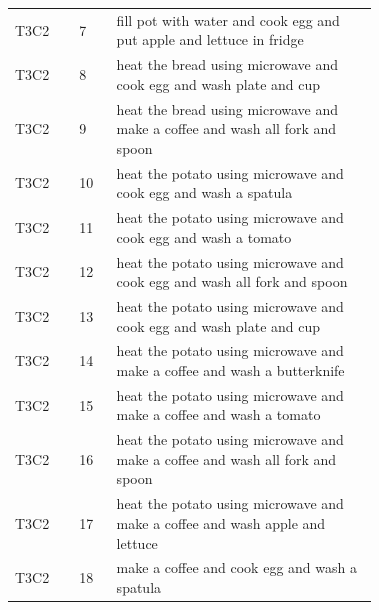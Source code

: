 \documentclass[letterpaper,10pt,onecolumn]{IEEEtran}
\begin{document}
{\begin{longtable}{@{}llp{0.72\linewidth}@{}}
T3C2 & 7 & fill pot with water and cook egg and put apple and lettuce in fridge \\
T3C2 & 8 & heat the bread using microwave and cook egg and wash plate and cup \\
T3C2 & 9 & heat the bread using microwave and make a coffee and wash all fork and spoon \\
T3C2 & 10 & heat the potato using microwave and cook egg and wash a spatula \\
T3C2 & 11 & heat the potato using microwave and cook egg and wash a tomato \\
T3C2 & 12 & heat the potato using microwave and cook egg and wash all fork and spoon \\
T3C2 & 13 & heat the potato using microwave and cook egg and wash plate and cup \\
T3C2 & 14 & heat the potato using microwave and make a coffee and wash a butterknife \\
T3C2 & 15 & heat the potato using microwave and make a coffee and wash a tomato \\
T3C2 & 16 & heat the potato using microwave and make a coffee and wash all fork and spoon \\
T3C2 & 17 & heat the potato using microwave and make a coffee and wash apple and lettuce \\
T3C2 & 18 & make a coffee and cook egg and wash a spatula \\
\end{longtable}
}

\newpage
\end{document}
